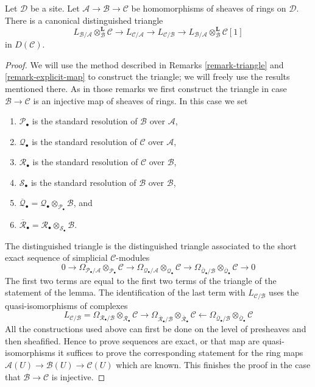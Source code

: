 \begin{lemma}
\label{lemma-triangle-sheaves-rings}
Let $\mathcal{D}$ be a site. Let $\mathcal{A} \to \mathcal{B} \to \mathcal{C}$
be homomorphisms of sheaves of rings on $\mathcal{D}$.
There is a canonical distinguished triangle
$$
L_{\mathcal{B}/\mathcal{A}} \otimes_\mathcal{B}^\mathbf{L} \mathcal{C}
\to L_{\mathcal{C}/\mathcal{A}} \to L_{\mathcal{C}/\mathcal{B}} \to
L_{\mathcal{B}/\mathcal{A}} \otimes_\mathcal{B}^\mathbf{L} \mathcal{C}[1]
$$
in $D(\mathcal{C})$.
\end{lemma}

\begin{proof}
We will use the method described in
Remarks \ref{remark-triangle} and \ref{remark-explicit-map}
to construct the triangle; we will freely use the results mentioned there.
As in those remarks we first construct the triangle in case
$\mathcal{B} \to \mathcal{C}$ is an injective map of sheaves of rings.
In this case we set
\begin{enumerate}
\item $\mathcal{P}_\bullet$ is the standard resolution of $\mathcal{B}$
over $\mathcal{A}$,
\item $\mathcal{Q}_\bullet$ is the standard resolution of $\mathcal{C}$
over $\mathcal{A}$,
\item $\mathcal{R}_\bullet$ is the standard resolution of $\mathcal{C}$
over $\mathcal{B}$,
\item $\mathcal{S}_\bullet$ is the standard resolution of $\mathcal{B}$
over $\mathcal{B}$,
\item $\overline{\mathcal{Q}}_\bullet =
\mathcal{Q}_\bullet \otimes_{\mathcal{P}_\bullet} \mathcal{B}$, and
\item $\overline{\mathcal{R}}_\bullet =
\mathcal{R}_\bullet \otimes_{\mathcal{S}_\bullet} \mathcal{B}$.
\end{enumerate}
The distinguished triangle is the distinguished triangle associated
to the short exact sequence
of simplicial $\mathcal{C}$-modules
$$
0 \to
\Omega_{\mathcal{P}_\bullet/\mathcal{A}}
\otimes_{\mathcal{P}_\bullet} \mathcal{C} \to
\Omega_{\mathcal{Q}_\bullet/\mathcal{A}}
\otimes_{\mathcal{Q}_\bullet} \mathcal{C} \to
\Omega_{\overline{\mathcal{Q}}_\bullet/\mathcal{B}}
\otimes_{\overline{\mathcal{Q}}_\bullet} \mathcal{C} \to 0
$$
The first two terms are equal to the first two terms of the triangle
of the statement of the lemma. The identification of the last term with
$L_{\mathcal{C}/\mathcal{B}}$ uses the quasi-isomorphisms of complexes
$$
L_{\mathcal{C}/\mathcal{B}} =
\Omega_{\mathcal{R}_\bullet/\mathcal{B}}
\otimes_{\mathcal{R}_\bullet} \mathcal{C}
\longrightarrow
\Omega_{\overline{\mathcal{R}}_\bullet/\mathcal{B}}
\otimes_{\overline{\mathcal{R}}_\bullet} \mathcal{C}
\longleftarrow
\Omega_{\overline{\mathcal{Q}}_\bullet/\mathcal{B}}
\otimes_{\overline{\mathcal{Q}}_\bullet} \mathcal{C}
$$
All the constructions used above can first be done on the level
of presheaves and then sheafified. Hence to prove sequences are exact,
or that map are quasi-isomorphisms it suffices to prove the corresponding
statement for the ring maps
$\mathcal{A}(U) \to \mathcal{B}(U) \to \mathcal{C}(U)$
which are known. This finishes the proof in the case that
$\mathcal{B} \to \mathcal{C}$ is injective.


\end{proof}
